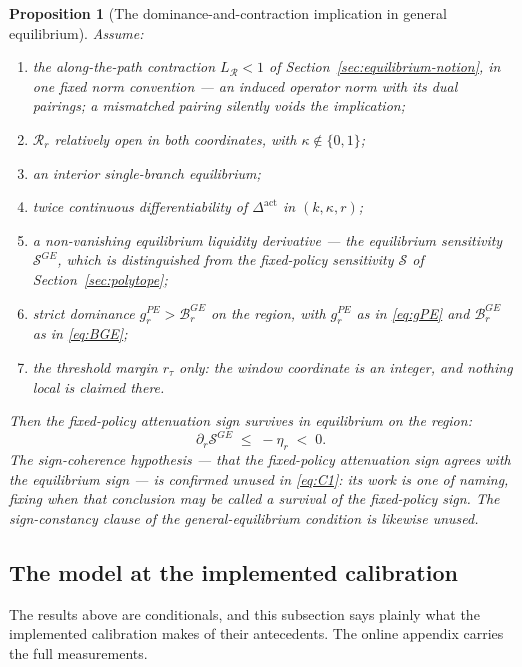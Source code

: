 \documentclass[11pt]{article}
\newtheorem{proposition}{Proposition}
\newcommand{\Dact}{\Delta^{\mathrm{act}}}
\begin{document}
\setcounter{proposition}{1}
\begin{proposition}[The dominance-and-contraction implication in general equilibrium]
\label{prop:C1}
Assume:
\begin{enumerate}[label=(C-\arabic*),leftmargin=3.2em,itemsep=3pt]
\item the along-the-path contraction $L_{\mathcal R} < 1$ of Section~\ref{sec:equilibrium-notion}, in
  \emph{one fixed norm convention} --- an induced operator norm with its dual pairings; a mismatched
  pairing silently voids the implication;
\item $\mathcal R_r$ relatively open in \emph{both} coordinates, with $\kappa \notin \{0,1\}$;
\item an interior single-branch equilibrium;
\item twice continuous differentiability of $\Dact$ in $(k,\kappa,r)$;
\item a non-vanishing \emph{equilibrium} liquidity derivative --- the equilibrium sensitivity
  $\mathcal S^{GE}$, which is distinguished from the fixed-policy sensitivity $\mathcal S$ of
  Section~\ref{sec:polytope};
\item strict dominance $g_r^{PE} > \mathcal B_r^{GE}$ on the region, with $g_r^{PE}$ as in
  \eqref{eq:gPE} and $\mathcal B_r^{GE}$ as in \eqref{eq:BGE};
\item the \emph{threshold} margin $r_\tau$ only: the window coordinate is an integer, and nothing
  local is claimed there.
\end{enumerate}
Then the fixed-policy attenuation sign survives in equilibrium on the region:
\begin{equation}
\label{eq:C1}
\partial_r \mathcal S^{GE} \;\le\; -\eta_r \;<\; 0 .
\end{equation}
The sign-coherence hypothesis --- that the fixed-policy attenuation sign agrees with the equilibrium
sign --- is confirmed unused in \eqref{eq:C1}: its work is one of naming, fixing when that conclusion
may be called a survival of the fixed-policy sign. The sign-constancy clause of the
general-equilibrium condition is likewise unused.
\end{proposition}

\subsection{The model at the implemented calibration}
\label{sec:calibration}

The results above are conditionals, and this subsection says plainly what the implemented
calibration makes of their antecedents. The online appendix carries the full measurements.
\end{document}
